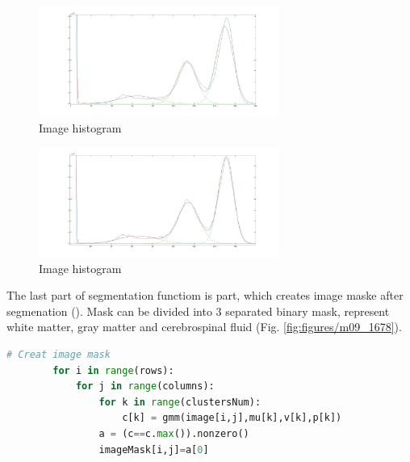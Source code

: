 \begin{figure}[H]
	\centering{}\includegraphics[width=0.7\textwidth]{figures/Module_09/m09_14}
	\caption{Image histogram  
	\label{fig:figures/m09_14}}
\end{figure} 

\begin{figure}[H]
	\centering{}\includegraphics[width=0.7\textwidth]{figures/Module_09/m09_15}
	\caption{Image histogram  
	\label{fig:figures/m09_15}}
\end{figure} 


The last part of segmentation functiom is part, which creates image maske after segmenation (). Mask can be divided into 3 separated binary mask, represent white matter, gray matter and cerebrospinal fluid (Fig. \ref{fig:figures/m09_1678}).


\begin{lstlisting}[language=Python, caption = PGeting part of image to segmentation]
# Creat image mask        
        for i in range(rows):
            for j in range(columns):
                for k in range(clustersNum):
                    c[k] = gmm(image[i,j],mu[k],v[k],p[k])
                a = (c==c.max()).nonzero()
                imageMask[i,j]=a[0]
\end{lstlisting}

